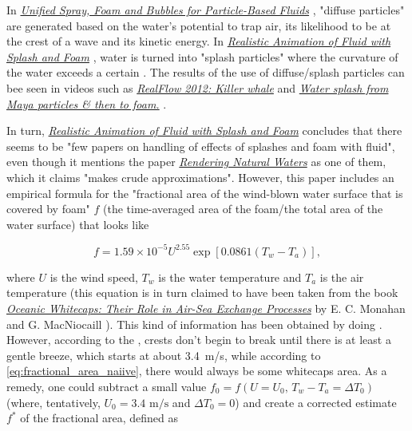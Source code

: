 In \textit{\href{http://cg.informatik.uni-freiburg.de/publications/2012_CGI_sprayFoamBubbles.pdf}{Unified Spray, Foam and Bubbles for Particle-Based Fluids}} \citep{temp}, "diffuse particles" are generated based on the water's potential to trap air, its likelihood to be at the crest of a wave and its kinetic energy. In \textit{\href{http://nguyendangbinh.org/Proceedings/Eurographics/2003/cgf/volume22/issue3/paper127/paper127.pdf}{Realistic Animation of Fluid with Splash and Foam}} \citep{temp}, water is turned into "splash particles" where the curvature of the water exceeds a certain \threshold. The results of the use of diffuse/splash particles can bee seen in videos such as 
\textit{\href{http://www.youtube.com/watch?v=c3JSbhgsoGg}{RealFlow 2012: Killer whale}} and
\textit{\href{http://www.youtube.com/watch?v=isXNkTiiAYQ}{Water splash from Maya particles \& then to foam.}} \citep{temp,temp}.

In turn, \textit{\href{http://nguyendangbinh.org/Proceedings/Eurographics/2003/cgf/volume22/issue3/paper127/paper127.pdf}{Realistic Animation of Fluid with Splash and Foam}} \citep{temp} concludes that there seems to be "few papers on handling of effects of splashes and foam with fluid", even though it mentions the paper \textit{\href{https://subversion.assembla.com/svn/gpuocean/trunk/docs/rendering-natural-waters-00.pdf}{Rendering Natural Waters}} \citep{temp} as one of them, which it claims "makes crude approximations". However, this paper includes an empirical formula for the "fractional area of the wind-blown water surface that is covered by foam" $f$ (the time-averaged area of the foam/the total area of the water surface) that looks like

\begin{equation} \label{eq:fractional_area_naiive}
f = 1.59 \times 10^{-5}U^{2.55}\exp[0.0861(T_w - T_a)],
\end{equation}

where $U$ is the wind speed, $T_w$ is the water temperature and $T_a$ is the air temperature (this equation is in turn claimed to have been taken from the book \textit{\href{http://books.google.se/books?id=xuwFz1bPTHgC}{Oceanic Whitecaps: Their Role in Air-Sea Exchange Processes}} by E. C. Monahan and G. MacNiocaill \citep{temp}). This kind of information has been obtained by doing . However, according to the , crests don't begin to break until there is at least a gentle breeze, which starts at about \mbox{3.4 m/s}, while according to \eqref{eq:fractional_area_naiive}, there would always be some whitecaps area. As a remedy, one could subtract a small value ${f_0 = f(U=U_0,\, T_w-T_a=\Delta T_0)}$ (where, tentatively, ${U_0 = 3.4\text{ m/s}}$ and ${\Delta T_0 = 0}$) and create a corrected estimate $f^*$ of the fractional area, defined as

